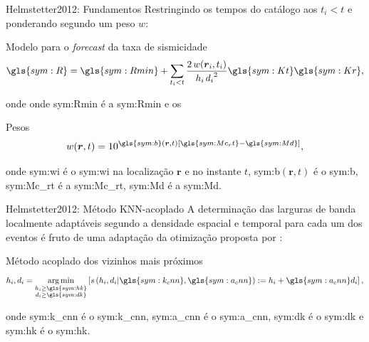 \documentclass[ucs,8pt]{beamer}
\DeclareMathOperator*{\argmin}{arg\,min}
\begin{document}
\begin{frame}{Helmstetter2012: Fundamentos}
Restringindo os tempos do catálogo aos $t_i
< t$ e ponderando segundo um peso $w$:
	\begin{block}{Modelo para o \emph{forecast} da taxa de sismicidade}
		\begin{equation}
		\ensuremath{\gls{sym:R} = \gls{sym:Rmin} + \sum_{t_i < t}{ 
			\frac{2\,w(\boldsymbol{r}_i,t_i)}{h_i\,{d_i}^2}
					\gls{sym:Kt}\gls{sym:Kr} }},
			\label{eq:helms02}
		\end{equation}
	\end{block}
	onde onde \gls{sym:Rmin} é a \glsdesc{sym:Rmin} e os

	\begin{block}{Pesos}
		\begin{equation}
			\ensuremath{ w(\boldsymbol{r},t) = 10^{ \gls{sym:b}(\boldsymbol{r},t) \left[ \gls{sym:Mc_rt} - \gls{sym:Md}
			\right] } },
			\label{eq:helms_wi}
		\end{equation}
	\end{block}

	onde \gls{sym:wi} é o \glsdesc{sym:wi} na localização $\boldsymbol{r}$ e no instante $t$, 
		  \gls{sym:b}$(\boldsymbol{r},t)$ é o \glsdesc{sym:b}, 
		  \gls{sym:Mc_rt} é a \glsdesc{sym:Mc_rt}, 
		  \gls{sym:Md} é a \glsdesc{sym:Md}.

\end{frame}


\begin{frame}{Helmstetter2012: Método KNN-acoplado}
	A determinação das larguras de banda \alert{localmente adaptáveis} segundo a densidade
	espacial e temporal para cada um dos eventos é fruto de uma adaptação da 
	otimização proposta por \citet{choi_1999}:
	\begin{block}{Método acoplado dos vizinhos mais próximos}
		\begin{equation}
			\ensuremath{
				h_i, d_i = \argmin_{\substack{h_i \ge \gls{sym:hk} \\
								              d_i \ge \gls{sym:dk}}
						           } 
				\left[ s \left(h_i,d_i 
					 		  \arrowvert
							  \gls{sym:k_cnn},\gls{sym:a_cnn}
					     \right) 
					   := h_i + \gls{sym:a_cnn}d_i 
			    \right],
			}
			\label{eq:helms_cnn}
		\end{equation}
	\end{block}
	onde \gls{sym:k_cnn} é o \glsdesc{sym:k_cnn},
		 \gls{sym:a_cnn} é o \glsdesc{sym:a_cnn},
		 \gls{sym:dk} é o \glsdesc{sym:dk} e 
		 \gls{sym:hk} é o \glsdesc{sym:hk}.
\end{frame}
\end{document}
